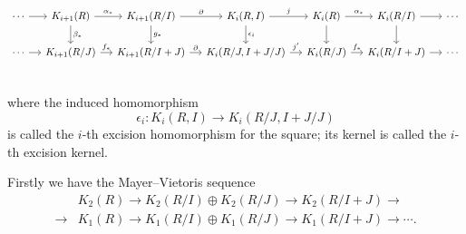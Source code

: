 \begin{equation}
\label{cdrelativeladder}
\begin{tikzcd}[column sep=small]
		\cdots  \ar[r]& K_{i+1}(R)\ar[r,"\alpha_*"] \ar[d,"\beta_*"]& K_{i+1}(R/I) \ar[r,"\partial"] \ar[d,"g_*"] &K_{i}(R,I) \ar[r,"j"] \ar[d,"\epsilon_i"] &K_{i}(R) \ar[r,"\alpha_*"] \ar[d] & K_{i}(R/I) \ar[r] \ar[d] & \cdots\\
		\cdots  \ar[r]& K_{i+1}(R/J)\ar[r,"f_*"] & K_{i+1}(R/I+J) \ar[r,"\partial"]  &K_{i}(R/J,I+J/J) \ar[r,"j'"]  &K_{i}(R/J) \ar[r,"f_*"]  & K_{i}(R/I+J) \ar[r]  & \cdots\\
	\end{tikzcd}
\end{equation}

	where the induced homomorphism 
	\[\epsilon_i \colon K_i(R,I) \longrightarrow K_i(R/J,I+J/J)\]
is called the $i$-th excision homomorphism for the square; its kernel is called the $i$-th excision kernel.

	Firstly we have the Mayer–Vietoris sequence
	\begin{align*}
	&K_2(R)\longrightarrow K_2(R/I)\oplus K_2(R/J)\longrightarrow K_2(R/I+J) \longrightarrow \\
	\longrightarrow &K_1(R) \longrightarrow K_1(R/I)\oplus K_1(R/J)\longrightarrow K_1(R/I+J)\longrightarrow \cdots.
	\end{align*}
	
